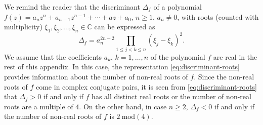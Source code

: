 We remind the reader that the discriminant $\Delta_f$ of a polynomial $f(z)= a_n z^n + a_{n-1} z^{n-1} + \cdots + a z+ a_0$, $n\geq 1$, $a_n\neq 0$, with roots (counted with multiplicity) $\xi_1, \xi_2,\dots,\xi_n\in\mathbb{C}$ can be expressed as
\begin{equation}
\Delta_f = a_n^{2n-2}\prod_{1 \leq j < k \leq n}\left(\xi_{j}-\xi_{k}\right)^{2}.
\label{eq:discriminant-roots}
\end{equation}
We assume that the coefficients $a_k$, $k=1,\dots,n$ of the polynomial $f$ are real in the rest of this appendix. In this case, the representation \eqref{eq:discriminant-roots} provides information about the number of non-real roots of $f$. Since the non-real roots of $f$ come in complex conjugate pairs, it is seen from \eqref{eq:discriminant-roots} that $\Delta_f>0$ if and only if $f$ has all distinct real roots or the number of non-real roots are a multiple of $4$. On the other hand, in case $n\geq 2$, $\Delta_f<0$ if and only if the number of non-real roots of $f$ is $2~\mathrm{mod}(4)$. 


